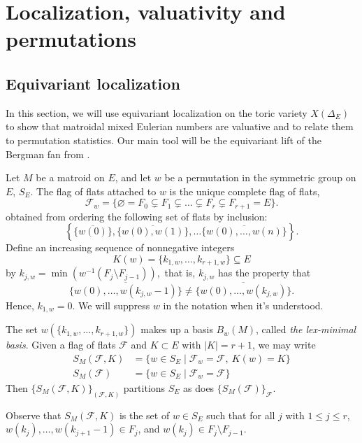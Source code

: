 \documentclass[ALCO,published]{cedram}
\numberwithin{equation}{section}
\numberwithin{figure}{section}
\newcommand{\cF}{\mathcal{F}}
\begin{document}
\section{Localization, valuativity and permutations} \label{s:localization}

\subsection{Equivariant localization}

In this section, we will use equivariant localization on the toric variety $X(\Delta_{E})$ to show that matroidal mixed Eulerian numbers are valuative and to relate them to permutation statistics. Our main tool will be the equivariant lift of the Bergman fan from \cite{BEST}.

\begin{defi}
Let $M$ be a matroid on $E$, and let $w$ be a permutation in the symmetric group on $E$, $S_{E}$. The flag of flats attached to $w$ is the unique complete flag of flats, 
\[\cF_w=\{\varnothing=F_0\subsetneq F_1\subsetneq \dots\subsetneq F_r\subsetneq F_{r+1}=E\}.\]
obtained from ordering the following set of flats by inclusion:
\[\left\{\overline{\{w(0)\}},\overline{\{w(0),w(1)\}},\dots \overline{\{w(0),\dots,w(n)\}}\right\}.\]
Define an increasing sequence of nonnegative integers 
\[K(w)=\{k_{1,w},\dots,k_{r+1,w}\}\subseteq E\] by 
$k_{j,w}=\min(w^{-1}(F_j\setminus F_{j-1})),$
that is, $k_{j,w}$ has the property that
\[\overline{\{w(0),\dots,w(k_{j,w}-1)\}}\neq \overline{\{w(0),\dots,w(k_{j,w})\}}.\]
Hence, $k_{1,w}=0$. We will suppress $w$ in the notation when it's understood. 
\end{defi}

The set $w\left(\{k_{1,w},\dots,k_{r+1,w}\}\right)$ makes up a basis $B_w(M)$, called {\em the lex-minimal basis}. 
Given a flag of flats $\cF$ and $K\subset E$ with $|K|=r+1$, we may write
\begin{align*}
S_M(\cF,K)&=\{w\in S_{E}\mid \cF_w=\cF,\ K(w)=K\}\\
S_M(\cF)&=\{w\in S_{E}\mid \cF_w=\cF\}
\end{align*}
Then $\{S_M(\cF,K)\}_{(\cF,K)}$ partitions $S_{E}$ as does $\{S_M(\cF)\}_{\cF}$.

Observe that $S_M(\cF,K)$ is the set of $w\in S_{E}$ such that
 for all $j$ with $1\leq j\leq r$, $w(k_j),\dots, w(k_{j+1}-1)\in F_j$, and $w(k_j)\in F_j\setminus F_{j-1}$.
\end{document}
